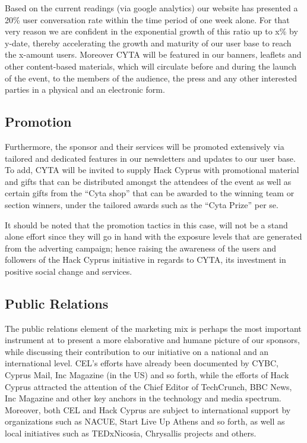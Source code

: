 \documentclass[a4paper,11pt]{report}
\begin{document}
Based on the current readings (via google analytics) our website has presented a 20\% user conversation rate within the time period of one week alone. For that very reason we are confident in the exponential growth of this ratio up to x\% by y-date, thereby accelerating the growth and maturity of our user base to reach the x-amount users. Moreover CYTA will be featured in our banners, leaflets and other content-based materials, which will circulate before and during the launch of the event, to the members of the audience, the press and any other interested parties in a physical and an electronic form.

\subsection{Promotion}

Furthermore, the sponsor and their services will be promoted extensively via tailored and dedicated features in our newsletters and updates to our user base. To add, CYTA will be invited to supply Hack Cyprus with promotional material and gifts that can be distributed amongst the attendees of the event as well as certain gifts from the “Cyta shop” that can be awarded to the winning team or section winners, under the tailored awards such as the “Cyta Prize” per se.

It should be noted that the promotion tactics in this case, will not be a stand alone effort since they will go in hand with the exposure levels that are generated from the adverting campaign; hence raising the awareness of the users and followers of the Hack Cyprus initiative in regards to CYTA, its investment in positive social change and services.

\subsection{Public Relations}

The public relations element of the marketing mix is perhaps the most important instrument at to present a more elaborative and humane picture of our sponsors, while discussing their contribution to our initiative on a national and an international level. CEL’s efforts have already been documented by CYBC, Cyprus Mail, Inc Magazine (in the US) and so forth, while the efforts of Hack Cyprus attracted the attention of the Chief Editor of TechCrunch, BBC News, Inc Magazine and other key anchors in the technology and media spectrum. Moreover, both CEL and Hack Cyprus are subject to international support by organizations such as NACUE, Start Live Up Athens and so forth, as well as local initiatives such as TEDxNicosia, Chrysallis projects and others.
\end{document}
